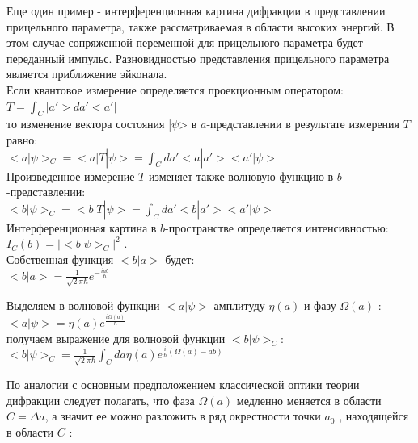 \documentclass[11pt]{report}
\begin{document}
Еще один пример - интерференционная картина дифракции в представлении прицельного параметра, также рассматриваемая в области высоких энергий. В этом случае сопряженной переменной для прицельного параметра будет переданный импульс. Разновидностью представления прицельного параметра является приближение эйконала. \\

Если квантовое измерение определяется проекционным оператором: \\

$T = \int_C|a' > da' < a'|$ \\

то изменение вектора состояния |$\psi$> в $a$-представлении в результате измерения $T$ равно: \\

$<a|\psi>_C = <a|T|\psi> = \int_C da'<a|a'><a'|\psi>$ \\

Произведенное измерение $T$ изменяет также волновую функцию в $b$-представлении: \\

$<b|\psi>_C = <b|T|\psi> = \int_C da'<b|a'><a'|\psi>$ \\
  
Интерференционная картина в $b$-пространстве определяется интенсивностью: \\
  
$I_C(b) = |<b|\psi>_C|^2$ . \\

Собственная функция $<b|a>$ будет:\\

$<b|a> =\frac{1}{\sqrt 2 \pi \hbar} e^{-\frac{iab}{\hbar}}$

Выделяем в волновой функции $<a|\psi>$ амплитуду $\eta(a) $ и фазу $\Omega(a)$ : \\

$<a|\psi> = \eta(a)e^{\frac{i\Omega(a)}{\hbar}}$ \\

получаем выражение для волновой функции $<b|\psi>_C$: \\

$<b|\psi>_C = \frac{1}{\sqrt 2 \pi \hbar} \int_C da \eta(a) e^{\frac{i}{\hbar}(\Omega(a) - ab)}$

По аналогии с основным предположением классической оптики теории дифракции следует полагать, что фаза $\Omega(a)$ медленно меняется в области $C=\Delta a$, а значит ее можно разложить в ряд окрестности точки $a_0$ , находящейся в области $C$ : \\ 
\end{document}
